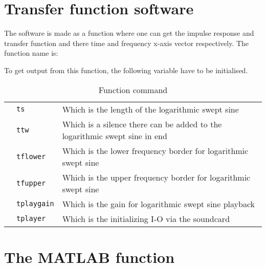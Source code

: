 \section*{Transfer function software}
The software is made as a function where one can get the impulse response and transfer function and there time and frequency x-axis vector respectively. The function name is:


To get output from this function, the following variable have to be initialised.



 \begin{table}[H]
\centering
\caption{Function command}
\label{my-label}
\begin{tabular}{lll}
 & \texttt{ts} & Which is the length of the logarithmic swept sine  \\
 & \texttt{ttw} & Which is a silence there can be added to the logarithmic swept sine in end   \\
 & \texttt{tflower} & Which is the lower frequency border for logarithmic swept sine   \\
 & \texttt{tfupper} & Which is the upper frequency border for logarithmic swept sine  \\
 & \texttt{tplaygain} & Which is the gain for logarithmic swept sine playback   \\
 & \texttt{tplayer}  & Which is the initializing I-O via the soundcard
\end{tabular}
\end{table}



\section*{The MATLAB function}

